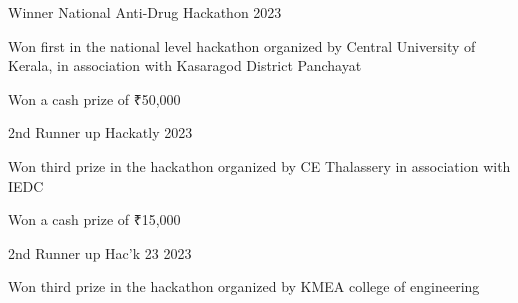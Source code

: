 
\begin{cventries}
  \cventry
    {Winner} %
    {National Anti-Drug Hackathon} %
    {}
    {2023} %
    {
      \begin{cvitems}
          \item {Won first in the national level hackathon organized by Central University of Kerala, in association with Kasaragod District Panchayat}
          \item {Won a cash prize of ₹50,000}
      \end{cvitems}
    }
  \cventry
    {2nd Runner up}
    {Hackatly}
    {}
    {2023}
    {
      \begin{cvitems}
          \item {Won third prize in the hackathon organized by CE Thalassery in association with IEDC}
          \item {Won a cash prize of ₹15,000}
      \end{cvitems}
    }
  \cventry
    {2nd Runner up}
    {Hac'k 23}
    {}
    {2023}
    {
      \begin{cvitems}
          \item {Won third prize in the hackathon organized by KMEA college of engineering}
      \end{cvitems}
    }
    
\end{cventries}